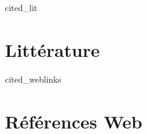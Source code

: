 \thispagestyle{empty}


\begin{btSect}[plain]{cited_lit}
\section*{Litt\'erature}
\setlength{\bibhang}{2em}
\btPrintCited
\end{btSect}

\nocite{*} 
\begin{btSect}[plain]{cited_weblinks}
\section*{R\'ef\'erences Web}
\setlength{\bibhang}{2em}
\btPrintCited
\end{btSect}
